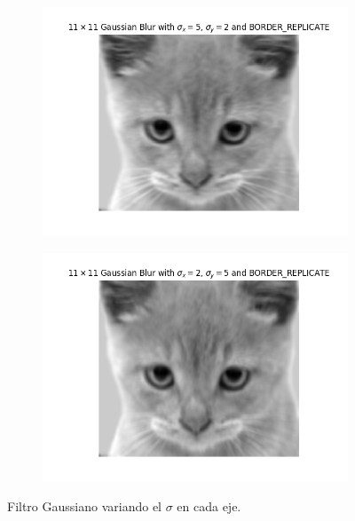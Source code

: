 \documentclass[11pt,a4paper]{article}
\begin{document}
\begin{figure}[H]
\begin{subfigure}{.5\textwidth}
	\centering
	\includegraphics[scale=0.45]{img/gauss-diff1.png}
	\label{fig:gauss-diff1}
\end{subfigure}
\begin{subfigure}{.5\textwidth}
	\centering
	\includegraphics[scale=0.45]{img/gauss-diff2.png}
	\label{fig:gauss-diff2}
\end{subfigure}
\caption{Filtro Gaussiano variando el $\sigma$ en cada eje.}
\label{fig:gauss-diff}
\end{figure}
\end{document}
